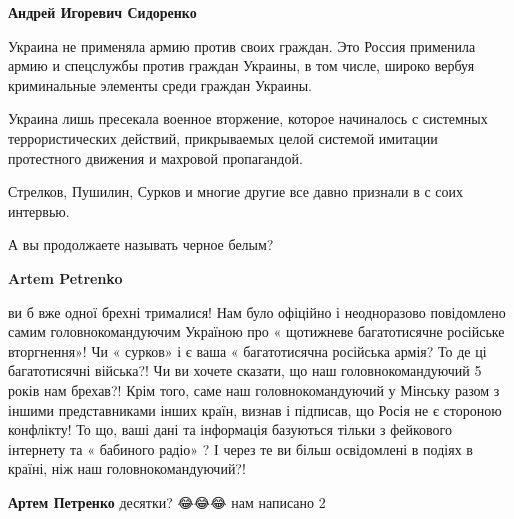 \begin{itemize}
\begin{itemize}
 
\textbf{Андрей Игоревич Сидоренко} 

Украина не применяла армию против своих граждан. Это Россия применила армию и
спецслужбы против граждан Украины, в том числе, широко вербуя криминальные
элементы среди граждан Украины.

Украина лишь пресекала военное вторжение, которое начиналось с системных
террористических действий, прикрываемых целой системой имитации протестного
движения и махровой пропагандой.

Стрелков, Пушилин, Сурков и многие другие все давно признали в с соих интервью.

А вы продолжаете называть черное белым?

 
\textbf{Artem Petrenko} 

ви б вже одної брехні трималися! Нам було офіційно і неодноразово повідомлено
самим головнокомандуючим Україною про « щотижневе багатотисячне російське
вторгнення»! Чи « сурков» і є ваша « багатотисячна російська армія? То де ці
багатотисячні війська?! Чи ви хочете сказати, що наш головнокомандуючий 5 років
нам брехав?! Крім того, саме наш головнокомандуючий у Мінську разом з іншими
представниками інших країн, визнав і підписав, що Росія не є стороною
конфлікту! То що, ваші дані та інформація базуються тільки з фейкового
інтернету та « бабиного радіо» ? І через те ви більш освідомлені в подіях в
країні, ніж наш головнокомандуючий?!

 
\textbf{Артем Петренко} десятки? 😂😂😂 нам написано 2

 

\end{itemize}
\end{itemize}
